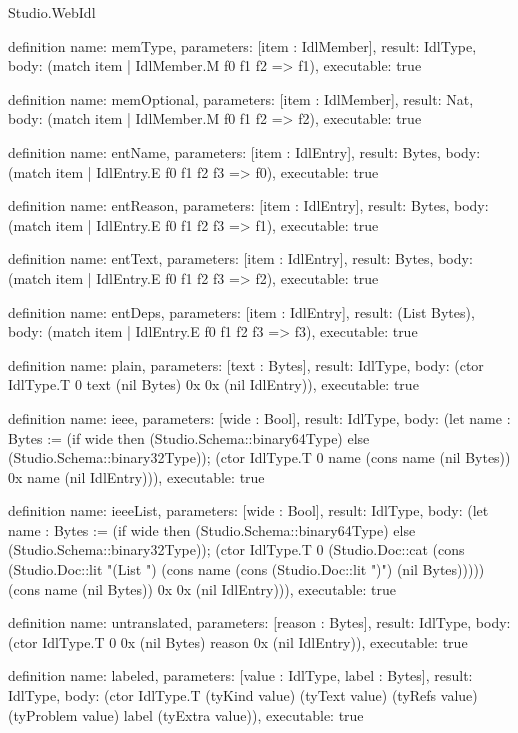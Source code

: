 \begin{lexlean}{Studio.WebIdl}
\begin{semanticmodule}
definition{
  name: memType,
  parameters: [item : IdlMember],
  result: IdlType,
  body: (match item
    | IdlMember.M f0 f1 f2 => f1),
  executable: true
}

definition{
  name: memOptional,
  parameters: [item : IdlMember],
  result: Nat,
  body: (match item
    | IdlMember.M f0 f1 f2 => f2),
  executable: true
}

definition{
  name: entName,
  parameters: [item : IdlEntry],
  result: Bytes,
  body: (match item
    | IdlEntry.E f0 f1 f2 f3 => f0),
  executable: true
}

definition{
  name: entReason,
  parameters: [item : IdlEntry],
  result: Bytes,
  body: (match item
    | IdlEntry.E f0 f1 f2 f3 => f1),
  executable: true
}

definition{
  name: entText,
  parameters: [item : IdlEntry],
  result: Bytes,
  body: (match item
    | IdlEntry.E f0 f1 f2 f3 => f2),
  executable: true
}

definition{
  name: entDeps,
  parameters: [item : IdlEntry],
  result: (List Bytes),
  body: (match item
    | IdlEntry.E f0 f1 f2 f3 => f3),
  executable: true
}

definition{
  name: plain,
  parameters: [text : Bytes],
  result: IdlType,
  body: (ctor IdlType.T 0 text (nil Bytes) 0x 0x (nil IdlEntry)),
  executable: true
}

definition{
  name: ieee,
  parameters: [wide : Bool],
  result: IdlType,
  body: (let name : Bytes := (if wide then (Studio.Schema::binary64Type) else (Studio.Schema::binary32Type)); (ctor IdlType.T 0 name (cons name (nil Bytes)) 0x name (nil IdlEntry))),
  executable: true
}

definition{
  name: ieeeList,
  parameters: [wide : Bool],
  result: IdlType,
  body: (let name : Bytes := (if wide then (Studio.Schema::binary64Type) else (Studio.Schema::binary32Type)); (ctor IdlType.T 0 (Studio.Doc::cat (cons (Studio.Doc::lit "(List ") (cons name (cons (Studio.Doc::lit ")") (nil Bytes))))) (cons name (nil Bytes)) 0x 0x (nil IdlEntry))),
  executable: true
}

definition{
  name: untranslated,
  parameters: [reason : Bytes],
  result: IdlType,
  body: (ctor IdlType.T 0 0x (nil Bytes) reason 0x (nil IdlEntry)),
  executable: true
}

definition{
  name: labeled,
  parameters: [value : IdlType, label : Bytes],
  result: IdlType,
  body: (ctor IdlType.T (tyKind value) (tyText value) (tyRefs value) (tyProblem value) label (tyExtra value)),
  executable: true
}


\end{semanticmodule}
\end{lexlean}
